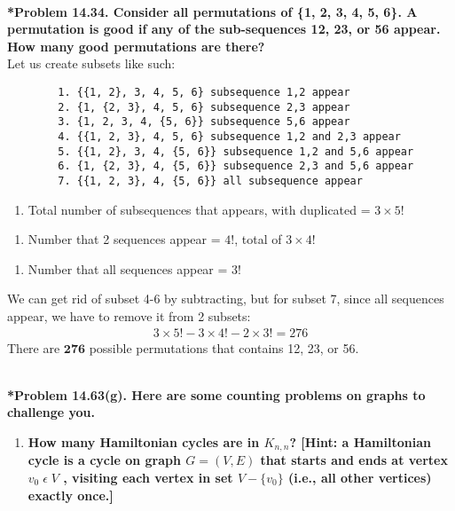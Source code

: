 \documentclass{article}
\begin{document}
    \noindent\\[0.25in]
    \noindent \textbf{*Problem 14.34. Consider all permutations of \{1, 2, 3, 4, 5, 6\}. A permutation is good if any of the sub-sequences 12, 23, or 56 appear. How many good permutations are there?}
    \\ Let us create subsets like such:
    \begin{verbatim}
        1. {{1, 2}, 3, 4, 5, 6} subsequence 1,2 appear
        2. {1, {2, 3}, 4, 5, 6} subsequence 2,3 appear
        3. {1, 2, 3, 4, {5, 6}} subsequence 5,6 appear
        4. {{1, 2, 3}, 4, 5, 6} subsequence 1,2 and 2,3 appear
        5. {{1, 2}, 3, 4, {5, 6}} subsequence 1,2 and 5,6 appear
        6. {1, {2, 3}, 4, {5, 6}} subsequence 2,3 and 5,6 appear
        7. {{1, 2, 3}, 4, {5, 6}} all subsequence appear
    \end{verbatim}
    \begin{enumerate}[label=1-3: ]
        \item Total number of subsequences that appears, with duplicated = $3 \times 5!$
    \end{enumerate}
    \begin{enumerate}[label=4-6: ]
        \item Number that 2 sequences appear = $4!$, total of $3 \times 4!$
    \end{enumerate}
    \begin{enumerate}[label=7: ]
        \item Number that all sequences appear = $3!$
    \end{enumerate}
    We can get rid of subset 4-6 by subtracting, but for subset 7, since all sequences appear, we have to remove it from 2 subsets:
    \begin{align*}
        3 \times 5! - 3 \times 4! - 2 \times 3! = 276
    \end{align*}
    There are {\LARGE $\boxed{\mathbf{276}}$} possible permutations that contains 12, 23, or 56.

    \noindent\\[0.25in]
    \noindent\textbf{*Problem 14.63(g). Here are some counting problems on graphs to challenge you.}
    \begin{enumerate}[label=(g)]
        \item \textbf{How many Hamiltonian cycles are in $K_{n,n}$? [Hint: a Hamiltonian cycle is a cycle on
        graph $G = (V, E)$ that starts and ends at vertex $v_0\;\epsilon\;V$ , visiting each vertex in set
        $V-\{v_0\}$ (i.e., all other vertices) exactly once.]}
    \end{enumerate}
\end{document}

